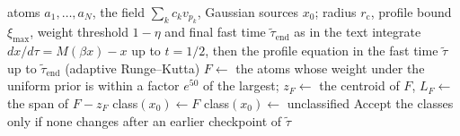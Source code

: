 \documentclass{article} %
\theoremstyle{plain}
\theoremstyle{definition}
\theoremstyle{remark}
\begin{document}
\begin{algorithm}[htb]
\caption{Endpoint classification by candidate (\texttt{theory\_basin\_map.py})}
\label{alg:classify}
\begin{algorithmic}[1]
\Require atoms $a_1,\dots,a_N$, the field $\sum_kc_kv_{p_k}$, Gaussian sources $x_0$; radius
  $r_{\mathrm{c}}$, profile bound $\xi_{\max}$, weight threshold $1-\eta$ and final fast time
  $\tilde\tau_{\mathrm{end}}$ as in the text
  \State integrate $dx/d\tau=M(\beta x)-x$ up to $t=1/2$, then the profile equation in the fast
    time $\tilde\tau$ up to $\tilde\tau_{\mathrm{end}}$ (adaptive Runge--Kutta)
  \State $F\gets$ the atoms whose weight under the uniform prior is within a factor $e^{50}$ of
    the largest; $z_F\gets$ the centroid of $F$, $L_F\gets$ the span of $F-z_F$
    \State class$(x_0)\gets F$ 
  \Else
    \State class$(x_0)\gets$ unclassified
  \EndIf
\EndFor
\State Accept the classes only if none changes after an earlier checkpoint of $\tilde\tau$
\end{algorithmic}
\end{algorithm}
\end{document}
